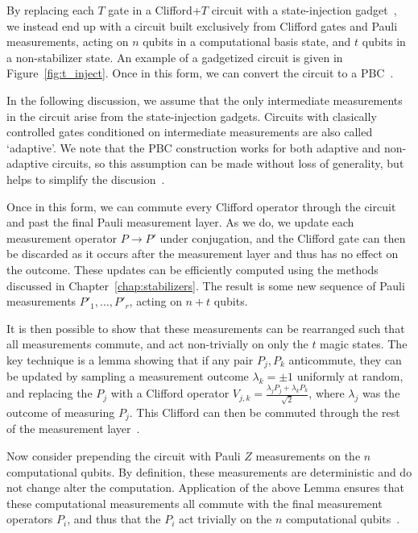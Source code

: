 By replacing each $T$ gate in a Clifford+$T$ circuit with a state-injection gadget~\cite{Bravyi2005}, we instead end up with a circuit built exclusively from Clifford gates and Pauli measurements, acting on $n$ qubits in a computational basis state, and $t$ qubits in a non-stabilizer state. An example of a gadgetized circuit is given in Figure~\ref{fig:t_inject}. Once in this form, we can convert the circuit to a PBC~\cite{Yoganathan2019,Bravyi2015}.\par
In the following discussion, we assume that the only intermediate measurements in the circuit arise from the state-injection gadgets. Circuits with clasically controlled gates conditioned on intermediate measurements are also called `adaptive'. We note that the PBC construction works for both adaptive and non-adaptive circuits, so this assumption can be made without loss of generality, but helps to simplify the discusion~\cite{Yoganathan2019,Bravyi2015}.\par
Once in this form, we can commute every Clifford operator through the circuit and past the final Pauli measurement layer. As we do, we update each measurement operator $P\rightarrow P'$ under conjugation, and the Clifford gate can then be discarded as it occurs after the measurement layer and thus has no effect on the outcome. These updates can be efficiently computed using the methods discussed in Chapter~\ref{chap:stabilizers}. The result is some new sequence of Pauli measurements $P'_{1},\dots,P'_{r}$, acting on $n+t$ qubits.\par
It is then possible to show that these measurements can be rearranged such that all measurements commute, and  act non-trivially on only the $t$ magic states. The key technique is a lemma showing that if any pair $P_{j},P_{k}$ anticommute, they can be updated by sampling a measurement outcome $\lambda_{k}=\pm1$ uniformly at random, and replacing the $P_{j}$ with a Clifford operator $V_{j,k}=\frac{\lambda_{j}P_{j}+\lambda_{k}P_{k}}{\sqrt{2}}$, where $\lambda_{j}$ was the outcome of measuring $P_{j}$. This Clifford can then be commuted through the rest of the measurement layer~\cite{Yoganathan2019}.\par
Now consider prepending the circuit with Pauli $Z$ measurements on the $n$ computational qubits. By definition, these measurements are deterministic and do not change alter the computation. Application of the above Lemma ensures that these computational measurements all commute with the final measurement operators $P_{i}$, and thus that the $P_{i}$ act trivially on the $n$ computational qubits~\cite{Bravyi2015}.\par
